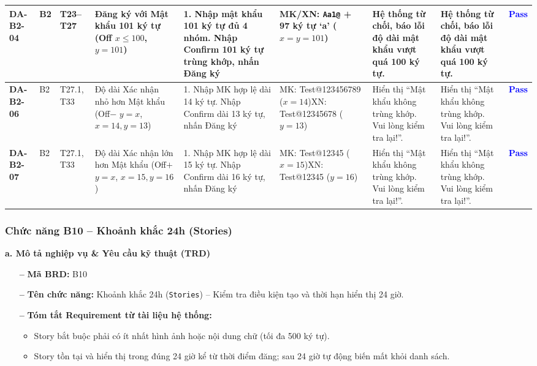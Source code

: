 \documentclass[11pt,a4paper]{article}
\begin{document}
\begin{longtable}{|C{0.95cm}|C{0.75cm}|C{0.95cm}|L{2.0cm}|L{2.95cm}|L{2.15cm}|L{2.6cm}|L{2.45cm}|C{0.85cm}|}
\textbf{DA-B2-04} & B2 & T23--T27 & Đăng ký với Mật khẩu 101 ký tự (Off $x \le 100$, $y = 101$) & 1. Nhập mật khẩu 101 ký tự đủ 4 nhóm. Nhập Confirm 101 ký tự trùng khớp, nhấn Đăng ký & MK/XN: \texttt{Aa1@} + 97 ký tự `a' ($x=y=101$) & Hệ thống từ chối, báo lỗi độ dài mật khẩu vượt quá 100 ký tự. & Hệ thống từ chối, báo lỗi độ dài mật khẩu vượt quá 100 ký tự. & \textcolor{blue}{\textbf{Pass}} \\ \hline
\textbf{DA-B2-06} & B2 & T27.1, T33 & Độ dài Xác nhận nhỏ hơn Mật khẩu (Off$-$ $y = x$, $x = 14, y = 13$) & 1. Nhập MK hợp lệ dài 14 ký tự. Nhập Confirm dài 13 ký tự, nhấn Đăng ký & MK: Test@123456789 ($x=14$)\newline XN: Test@12345678 ($y=13$) & Hiển thị ``Mật khẩu không trùng khớp. Vui lòng kiểm tra lại!''. & Hiển thị ``Mật khẩu không trùng khớp. Vui lòng kiểm tra lại!''. & \textcolor{blue}{\textbf{Pass}} \\ \hline
\textbf{DA-B2-07} & B2 & T27.1, T33 & Độ dài Xác nhận lớn hơn Mật khẩu (Off$+$ $y = x$, $x = 15, y = 16$) & 1. Nhập MK hợp lệ dài 15 ký tự. Nhập Confirm dài 16 ký tự, nhấn Đăng ký & MK: Test@12345 ($x=15$)\newline XN: Test@12345 ($y=16$) & Hiển thị ``Mật khẩu không trùng khớp. Vui lòng kiểm tra lại!''. & Hiển thị ``Mật khẩu không trùng khớp. Vui lòng kiểm tra lại!''. & \textcolor{blue}{\textbf{Pass}} \\ \hline
\end{longtable}
\endgroup


\subsubsection{Chức năng B10 -- Khoảnh khắc 24h (Stories)}

\noindent\textbf{a. Mô tả nghiệp vụ \& Yêu cầu kỹ thuật (TRD)}
\begin{itemize}[leftmargin=1.2cm, noitemsep]
    \item[\textbf{--}] \textbf{Mã BRD:} B10
    \item[\textbf{--}] \textbf{Tên chức năng:} Khoảnh khắc 24h (\texttt{Stories}) -- Kiểm tra điều kiện tạo và thời hạn hiển thị 24 giờ.
    \item[\textbf{--}] \textbf{Tóm tắt Requirement từ tài liệu hệ thống:}
    \begin{itemize}[leftmargin=0.8cm, label=$\bullet$, noitemsep]
        \item Story bắt buộc phải có ít nhất hình ảnh hoặc nội dung chữ (tối đa 500 ký tự).
        \item Story tồn tại và hiển thị trong đúng 24 giờ kể từ thời điểm đăng; sau 24 giờ tự động biến mất khỏi danh sách.
    \end{itemize}
\end{itemize}
\end{document}
